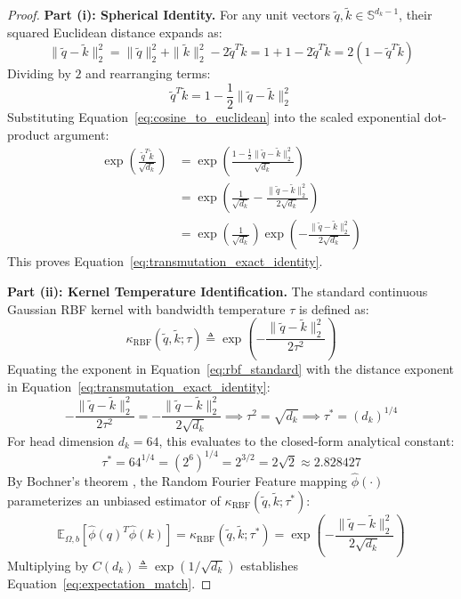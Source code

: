 \begin{proof}
\textbf{Part (i): Spherical Identity.}
For any unit vectors $\tilde{q}, \tilde{k} \in \mathbb{S}^{d_k-1}$, their squared Euclidean distance expands as:
\begin{equation}
\|\tilde{q} - \tilde{k}\|_2^2 = \|\tilde{q}\|_2^2 + \|\tilde{k}\|_2^2 - 2 \tilde{q}^T \tilde{k} = 1 + 1 - 2 \tilde{q}^T \tilde{k} = 2\left(1 - \tilde{q}^T \tilde{k}\right)
\label{eq:chordal_dist_expansion}
\end{equation}
Dividing by $2$ and rearranging terms:
\begin{equation}
\tilde{q}^T \tilde{k} = 1 - \frac{1}{2} \|\tilde{q} - \tilde{k}\|_2^2
\label{eq:cosine_to_euclidean}
\end{equation}
Substituting Equation~\ref{eq:cosine_to_euclidean} into the scaled exponential dot-product argument:
\begin{align}
\exp\left( \frac{\tilde{q}^T \tilde{k}}{\sqrt{d_k}} \right) &= \exp\left( \frac{1 - \frac{1}{2} \|\tilde{q} - \tilde{k}\|_2^2}{\sqrt{d_k}} \right) \nonumber \\
&= \exp\left( \frac{1}{\sqrt{d_k}} - \frac{\|\tilde{q} - \tilde{k}\|_2^2}{2\sqrt{d_k}} \right) \nonumber \\
&= \exp\left( \frac{1}{\sqrt{d_k}} \right) \exp\left( -\frac{\|\tilde{q} - \tilde{k}\|_2^2}{2\sqrt{d_k}} \right)
\end{align}
This proves Equation~\ref{eq:transmutation_exact_identity}.

\bigskip
\noindent
\textbf{Part (ii): Kernel Temperature Identification.}
The standard continuous Gaussian RBF kernel with bandwidth temperature $\tau$ is defined as:
\begin{equation}
\kappa_{\text{RBF}}(\tilde{q}, \tilde{k}; \tau) \triangleq \exp\left( -\frac{\|\tilde{q} - \tilde{k}\|_2^2}{2\tau^2} \right)
\label{eq:rbf_standard}
\end{equation}
Equating the exponent in Equation~\ref{eq:rbf_standard} with the distance exponent in Equation~\ref{eq:transmutation_exact_identity}:
\begin{equation}
-\frac{\|\tilde{q} - \tilde{k}\|_2^2}{2\tau^2} = -\frac{\|\tilde{q} - \tilde{k}\|_2^2}{2\sqrt{d_k}} \implies \tau^2 = \sqrt{d_k} \implies \tau^* = \left(d_k\right)^{1/4}
\end{equation}
For head dimension $d_k = 64$, this evaluates to the closed-form analytical constant:
\begin{equation}
\tau^* = 64^{1/4} = \left(2^6\right)^{1/4} = 2^{3/2} = 2\sqrt{2} \approx 2.828427
\end{equation}
By Bochner's theorem \citep{bochner1959lectures}, the Random Fourier Feature mapping $\hat{\phi}(\cdot)$ parameterizes an unbiased estimator of $\kappa_{\text{RBF}}(\tilde{q}, \tilde{k}; \tau^*)$:
\begin{equation}
\mathbb{E}_{\Omega, b}\left[ \hat{\phi}(q)^T \hat{\phi}(k) \right] = \kappa_{\text{RBF}}(\tilde{q}, \tilde{k}; \tau^*) = \exp\left( -\frac{\|\tilde{q} - \tilde{k}\|_2^2}{2\sqrt{d_k}} \right)
\end{equation}
Multiplying by $C(d_k) \triangleq \exp(1/\sqrt{d_k})$ establishes Equation~\ref{eq:expectation_match}.


\end{proof}
